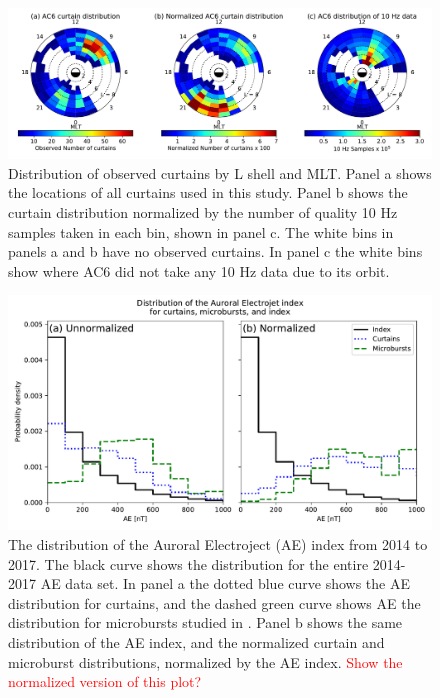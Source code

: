 \documentclass[draft]{agujournal2019}
\begin{document}
\begin{figure}
\includegraphics[width=\textwidth]{fig2_2.pdf}
\caption{Distribution of observed curtains by L shell and MLT. Panel a shows the locations of all curtains used in this study. Panel b shows the curtain distribution normalized by the number of quality 10 Hz samples taken in each bin, shown in panel c. The white bins in panels a and b have no observed curtains. In panel c the white bins show where AC6 did not take any 10 Hz data due to its orbit.}
\label{l_mlt_dist}
\end{figure}

\begin{figure}
\includegraphics[width=\textwidth]{ac6_curtain_microburst_AE_dist.pdf}
\caption{The distribution of the Auroral Electroject (AE) index from 2014 to 2017. The black curve shows the distribution for the entire 2014-2017 AE data set. In panel a the dotted blue curve shows the AE distribution for curtains, and the dashed green curve shows AE the distribution for microbursts studied in . Panel b shows the same distribution of the AE index, and the normalized curtain and microburst distributions, normalized by the AE index. \textcolor{red}{Show the normalized version of this plot?}}
\label{ae_dist}
\end{figure}
\end{document}

